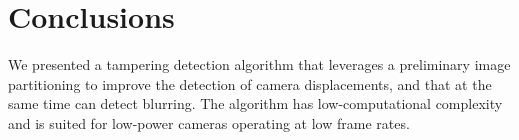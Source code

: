 \documentclass{llncs}
\begin{document}
%

\vspace{-0.3cm}
\section{Conclusions}\label{sec:Conclusion}
\vspace{-0.1cm}
We presented a tampering detection algorithm that leverages a preliminary image partitioning to improve the detection of camera displacements, and that at the same time can detect blurring. The algorithm has low-computational complexity and is suited for low-power cameras operating at low frame rates.
\end{document}
